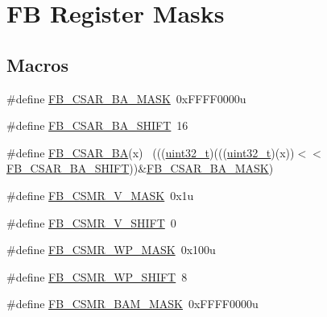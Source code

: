 \hypertarget{group___f_b___register___masks}{}\section{FB Register Masks}
\label{group___f_b___register___masks}
\subsection*{Macros}
\begin{DoxyCompactItemize}
\item 
\#define \hyperlink{group___f_b___register___masks_ga917335c957f6472faf91ae0b244db487}{F\+B\+\_\+\+C\+S\+A\+R\+\_\+\+B\+A\+\_\+\+M\+A\+SK}~0x\+F\+F\+F\+F0000u
\item 
\#define \hyperlink{group___f_b___register___masks_ga098f6109a1dcc8cc007bca53c312810f}{F\+B\+\_\+\+C\+S\+A\+R\+\_\+\+B\+A\+\_\+\+S\+H\+I\+FT}~16
\item 
\#define \hyperlink{group___f_b___register___masks_ga4241bb44a894dd2be2480feaf7eb2e21}{F\+B\+\_\+\+C\+S\+A\+R\+\_\+\+BA}(x)                                                    ~(((\hyperlink{_p_e___types_8h_a33594304e786b158f3fb30289278f5af}{uint32\+\_\+t})(((\hyperlink{_p_e___types_8h_a33594304e786b158f3fb30289278f5af}{uint32\+\_\+t})(x))$<$$<$\hyperlink{group___f_b___register___masks_ga098f6109a1dcc8cc007bca53c312810f}{F\+B\+\_\+\+C\+S\+A\+R\+\_\+\+B\+A\+\_\+\+S\+H\+I\+FT}))\&\hyperlink{group___f_b___register___masks_ga917335c957f6472faf91ae0b244db487}{F\+B\+\_\+\+C\+S\+A\+R\+\_\+\+B\+A\+\_\+\+M\+A\+SK})
\item 
\#define \hyperlink{group___f_b___register___masks_ga746554e800a78e64f18c333f8b3dbd2c}{F\+B\+\_\+\+C\+S\+M\+R\+\_\+\+V\+\_\+\+M\+A\+SK}~0x1u
\item 
\#define \hyperlink{group___f_b___register___masks_ga62bde86e3e74e677b6cb555c806d1dc3}{F\+B\+\_\+\+C\+S\+M\+R\+\_\+\+V\+\_\+\+S\+H\+I\+FT}~0
\item 
\#define \hyperlink{group___f_b___register___masks_ga40725292274706aa0a0c013201498f4b}{F\+B\+\_\+\+C\+S\+M\+R\+\_\+\+W\+P\+\_\+\+M\+A\+SK}~0x100u
\item 
\#define \hyperlink{group___f_b___register___masks_ga6d49da1d3aabbb8619673ac0fba95dd1}{F\+B\+\_\+\+C\+S\+M\+R\+\_\+\+W\+P\+\_\+\+S\+H\+I\+FT}~8
\item 
\#define \hyperlink{group___f_b___register___masks_ga9f7361c70716e7a39579b6418ae2c20c}{F\+B\+\_\+\+C\+S\+M\+R\+\_\+\+B\+A\+M\+\_\+\+M\+A\+SK}~0x\+F\+F\+F\+F0000u
\item 
$$
\end{DoxyCompactItemize}
